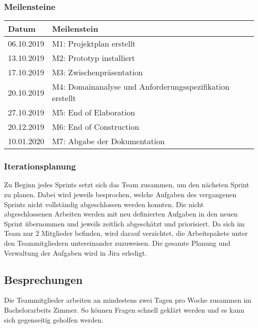 \subsubsection{Meilensteine}
\begin{center}
	\begin{tabular}{| m{3cm} | m{9cm}|}
	\hline
	\textbf{Datum} & \textbf{Meilenstein} \\
	\hline
	06.10.2019 & M1: Projektplan erstellt \\
	\hline
	13.10.2019 & M2: Prototyp installiert \\
	\hline
	17.10.2019 & M3: Zwischenpräsentation \\
	\hline
	20.10.2019 & M4: Domainanalyse und Anforderungsspezifikation erstellt \\
	\hline
	27.10.2019 & M5: End of Elaboration \\
	\hline
	20.12.2019 & M6: End of Construction \\
	\hline
	10.01.2020 & M7: Abgabe der Dokumentation \\
	\hline
	\end{tabular}
\end{center}

\subsubsection{Iterationsplanung}
Zu Beginn jedes Sprints setzt sich das Team zusammen, um den nächsten Sprint zu planen. Dabei wird jeweils besprochen, welche Aufgaben des vergangenen Sprints nicht vollständig abgeschlossen werden konnten. Die nicht abgeschlossenen Arbeiten werden mit neu definierten Aufgaben in den neuen Sprint übernommen und jeweils zeitlich abgeschätzt und priorisiert. Da sich im Team nur 2 Mitglieder befinden, wird darauf verzichtet, die Arbeitspakete unter den Teammitgliedern untereinander zuzuweisen. Die gesamte Planung und Verwaltung der Aufgaben wird in Jira erledigt.

\subsection{Besprechungen}
Die Teammitglieder arbeiten an mindestens zwei Tagen pro Woche zusammen im Bachelorarbeits Zimmer. So können Fragen schnell geklärt werden und es kann sich gegenseitig geholfen werden.


\newpage